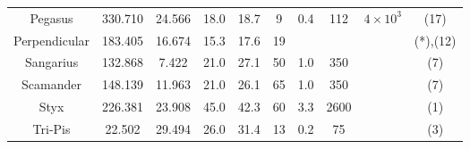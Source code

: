 \begin{table}
\begin{tabular}{cSSSScSccc}
Pegasus & 330.710 & 24.566 & 18.0 & 18.7 & 9 & 0.4 & 112 & $4 \times 10^{3}$ & (17) \\
Perpendicular & 183.405 & 16.674 & 15.3 & 17.6 & 19 & & & & (*),(12) \\
Sangarius & 132.868 & 7.422 & 21.0 & 27.1 & 50 & 1.0 & 350 & & (7) \\
Scamander & 148.139 & 11.963 & 21.0 & 26.1 & 65 & 1.0 & 350 & & (7) \\
Styx & 226.381 & 23.908 & 45.0 & 42.3 & 60 & 3.3 & 2600 & & (1) \\
Tri-Pis & 22.502 & 29.494 & 26.0 & 31.4 & 13 & 0.2 & 75 & & (3) \\
\hline \hline
\end{tabular}
\end{table}
